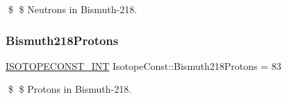 \$ \$ Neutrons in Bismuth-\/218. \mbox{\label{group___isotope_const-_bismuth-_bi218_ga99e855b494cd6569161abd1d37eeb29c}} 
\subsubsection{\texorpdfstring{Bismuth218\+Protons}{Bismuth218Protons}}
{\footnotesize\ttfamily \mbox{\hyperlink{group___isotope_const-_macros_ga5f18360b3e99483a35c32d789e62621c}{I\+S\+O\+T\+O\+P\+E\+C\+O\+N\+S\+T\+\_\+\+I\+NT}} Isotope\+Const\+::\+Bismuth218\+Protons = 83}

\$ \$ Protons in Bismuth-\/218. 